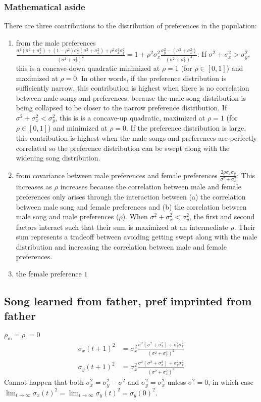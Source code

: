 \documentclass{article}
\newcommand{\x}[1]{\text{#1}}
\begin{document}
\subsubsection*{Mathematical aside}
There are three contributions to the distribution of preferences in the population:
\begin{enumerate}
\item from the male preferences $\frac{\sigma^2(\sigma^2+\sigma_x^2)+(1-\rho^2)\sigma_x^2(\sigma^2+\sigma_x^2)+\rho^2\sigma_x^2\sigma_y^2}{(\sigma^2+\sigma_x^2)^2}=1+\rho^2\sigma_x^2\frac{\sigma_y^2-(\sigma^2+\sigma_x^2)}{(\sigma^2+\sigma_x^2)^2}$: If $\sigma^2+\sigma_x^2>\sigma_y^2$, this is a concave-down quadratic minimized at $\rho=1$ (for $\rho\in[0,1]$) and maximized at $\rho=0$. In other words, if the preference distribution is sufficiently narrow, this contribution is highest when there is no correlation between male songs and preferences, because the male song distribution is being collapsed to be closer to the narrow preference distribution. If $\sigma^2+\sigma_x^2<\sigma_y^2$, this is is a concave-up quadratic, maximized at $\rho=1$ (for $\rho\in[0,1]$) and minimized at $\rho=0$. If the preference distribution is large, this contribution is highest when the male songs and preferences are perfectly correlated so the preference distribution can be swept along with the widening song distribution.
\item from covariance between male preferences and female preferences $\frac{2\rho\sigma_x\sigma_y}{\sigma^2+\sigma_x^2}$: This increases as $\rho$ increases because the correlation between male and female preferences only arises through the interaction between (a) the correlation between male song and female preferences and (b) the correlation between male song and male preferences ($\rho$).  When $\sigma^2+\sigma_x^2<\sigma_y^2$, the first and second factors interact such that their sum is maximized at an intermediate $\rho$. Their sum represents a tradeoff between avoiding getting swept along with the male distribution and increasing the correlation between male and female preferences.
\item the female preference $1$
\end{enumerate}

\subsection{Song learned from father, pref imprinted from father } 
$\rho_\x{m}=\rho_\x{f}=0$
\begin{align*}
\sigma_x(t+1)^2&=\sigma_x^2\frac{\sigma^2(\sigma^2+\sigma_x^2)+\sigma_y^2\sigma_x^2}{(\sigma^2+\sigma_x^2)^2} 
\\ \sigma_y(t+1)^2&=\sigma_x^2\frac{\sigma^2(\sigma^2+\sigma_x^2)+\sigma_y^2\sigma_x^2}{(\sigma^2+\sigma_x^2)^2}
\end{align*}
Cannot happen that both $\sigma_x^2=\sigma_y^2-\sigma^2$ and $\sigma_y^2=\sigma_x^2$ unless $\sigma^2=0$, in which case $\lim_{t\to\infty}\sigma_x(t)^2=\lim_{t\to\infty}\sigma_y(t)^2=\sigma_y(0)^2$.
\end{document}
